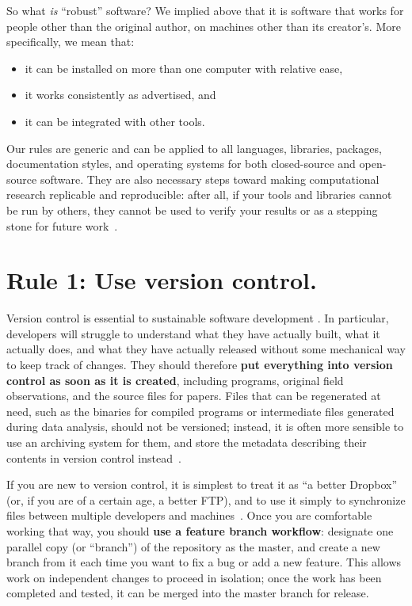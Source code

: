 \documentclass[10pt,letterpaper]{article}
\newcommand{\rulemajor}[1]{\section*{#1}}
\newcommand{\ruleminor}[1]{\textbf{#1}}
\begin{document}
So what \emph{is} ``robust'' software?  We implied above that it is
software that works for people other than the original author, on
machines other than its creator's.  More specifically, we mean that:

\begin{itemize}

\item
  it can be installed on more than one computer with relative ease,

\item
  it works consistently as advertised, and

\item
  it can be integrated with other tools.

\end{itemize}

Our rules are generic and can be applied to all languages, libraries,
packages, documentation styles, and operating systems for both
closed-source and open-source software.  They are also necessary steps
toward making computational research replicable and reproducible:
after all, if your tools and libraries cannot be run by others, they
cannot be used to verify your results or as a stepping stone for
future work~\cite{brown2013}.

\rulemajor{Rule 1: Use version control.}

Version control is essential to sustainable software development
\cite{wilson2014,wilson2016}.  In particular, developers will struggle
to understand what they have actually built, what it actually does,
and what they have actually released without some mechanical way to
keep track of changes.  They should therefore \ruleminor{put
everything into version control as soon as it is
created}, including programs, original field observations, and the
source files for papers.  Files that can be regenerated at need, such
as the binaries for compiled programs or intermediate files generated
during data analysis, should not be versioned; instead, it is often
more sensible to use an archiving system for them, and store the
metadata describing their contents in version control
instead~\cite{noble2009}.

If you are new to version control, it is simplest to treat it as ``a
better Dropbox'' (or, if you are of a
certain age, a better FTP), and to use it simply to synchronize files
between multiple developers and machines~\cite{blischak2016}.  Once
you are comfortable working that way, you should \ruleminor{use a
feature branch workflow}: designate one parallel copy (or
``branch'') of the repository as the master, and create a new branch
from it each time you want to fix a bug or add a new feature.  This
allows work on independent changes to proceed in isolation; once the
work has been completed and tested, it can be merged into the master
branch for release.
\end{document}
